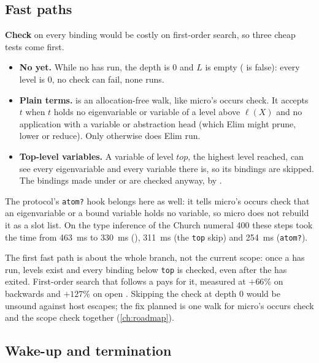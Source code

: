 \subsection{Fast paths}\label{sec:module-fast}

\textbf{Check} on every binding would be costly on first-order search, so three cheap tests come first.
\begin{itemize}
  \item \textbf{No  yet.} While no  has run, the depth is 0 and $L$ is empty
    ( is false): every level is 0, no check can fail, none runs.
  \item \textbf{Plain terms.}  is an allocation-free walk, like micro's occurs check. It
    accepts $t$ when $t$ holds no eigenvariable or variable of a level above $\ell(X)$ and no application with a
    variable or abstraction head (which Elim might prune, lower or reduce). Only otherwise does Elim run.
  \item \textbf{Top-level variables.} A variable of level $\mathit{top}$, the highest level reached, can see
    every eigenvariable and every variable there is, so its bindings are skipped. The bindings made under
     or  are checked anyway, by .
\end{itemize}
The protocol's \texttt{atom?} hook belongs here as well: it tells micro's occurs check that an eigenvariable or
a bound variable holds no variable, so micro does not rebuild it as a slot list. On the type inference of the
Church numeral 400 these steps took the time from 463~ms to 330~ms (), 311~ms (the \texttt{top}
skip) and 254~ms (\texttt{atom?}).

\begin{pitfall}
The first fast path is about the whole branch, not the current scope: once a  has run, levels exist
and every binding below \texttt{top} is checked, even after the  has exited. First-order search that
follows a  pays for it, measured at $+66\%$ on  backwards and $+127\%$ on open
. Skipping the check at depth 0 would be unsound against host escapes; the fix planned is one walk
for micro's occurs check and the scope check together (\cref{ch:roadmap}).
\end{pitfall}

\subsection{Wake-up and termination}\label{sec:module-wake}

